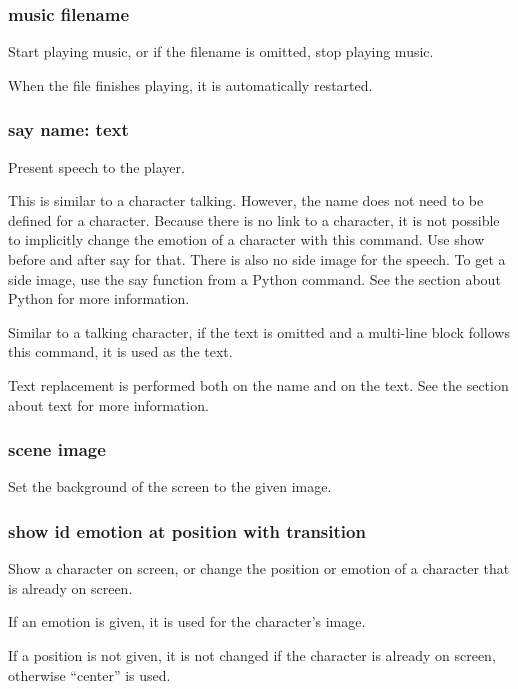 \documentclass{article}
\begin{document}
\subsubsection{music filename}
Start playing music, or if the filename is omitted, stop playing music.

When the file finishes playing, it is automatically restarted.

\subsubsection{say name: text}
Present speech to the player.

This is similar to a character talking. However, the name does not need to be
defined for a character. Because there is no link to a character, it is not
possible to implicitly change the emotion of a character with this command. Use
show before and after say for that. There is also no side image for the speech.
To get a side image, use the say function from a Python command. See the
section about Python for more information.

Similar to a talking character, if the text is omitted and a multi-line block
follows this command, it is used as the text.

Text replacement is performed both on the name and on the text. See the section
about text for more information.

\subsubsection{scene image}
Set the background of the screen to the given image.

\subsubsection{show id emotion at position with transition}
Show a character on screen, or change the position or emotion of a character
that is already on screen.

If an emotion is given, it is used for the character's image.

If a position is not given, it is not changed if the character is already on
screen, otherwise ``center'' is used.
\end{document}
